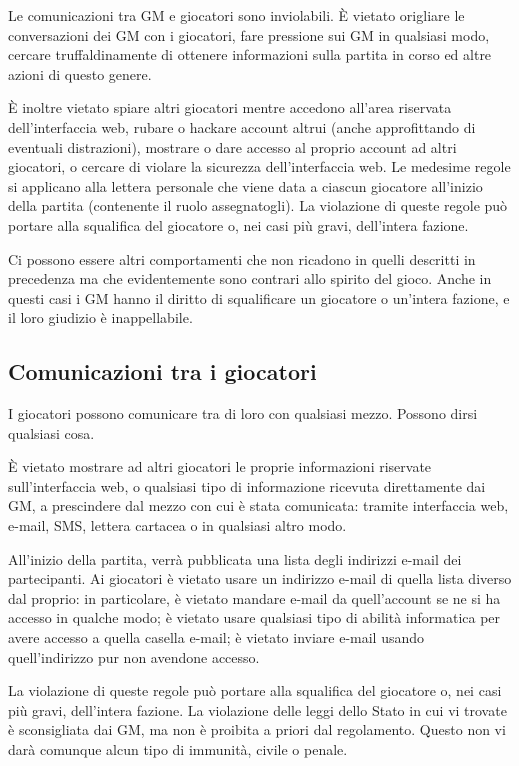 \documentclass[a4paper,10pt]{article}
\begin{document}
Le comunicazioni tra GM e giocatori sono inviolabili. È vietato origliare le conversazioni dei GM con i giocatori, fare pressione sui GM in qualsiasi modo, cercare truffaldinamente di ottenere informazioni sulla partita in corso ed altre azioni di questo genere.

È inoltre vietato spiare altri giocatori mentre accedono all'area riservata dell'interfaccia web, rubare o hackare account altrui (anche approfittando di eventuali distrazioni), mostrare o dare accesso al proprio account ad altri giocatori, o cercare di violare la sicurezza dell'interfaccia web. Le medesime regole si applicano alla lettera personale che viene data a ciascun giocatore all'inizio della partita (contenente il ruolo assegnatogli). La violazione di queste regole può portare alla squalifica del giocatore o, nei casi più gravi, dell'intera fazione.

Ci possono essere altri comportamenti che non ricadono in quelli descritti in precedenza ma che evidentemente sono contrari allo spirito del gioco. Anche in questi casi i GM hanno il diritto di squalificare un giocatore o un'intera fazione, e il loro giudizio è inappellabile.


\subsection{Comunicazioni tra i giocatori}

I giocatori possono comunicare tra di loro con qualsiasi mezzo. Possono dirsi qualsiasi cosa.

È vietato mostrare ad altri giocatori le proprie informazioni riservate sull'interfaccia web, o qualsiasi tipo di informazione ricevuta direttamente dai GM, a prescindere dal mezzo con cui è stata comunicata: tramite interfaccia web, e-mail, SMS, lettera cartacea o in qualsiasi altro modo.

All'inizio della partita, verrà pubblicata una lista degli indirizzi e-mail dei partecipanti. Ai giocatori è vietato usare un indirizzo e-mail di quella lista diverso dal proprio: in particolare, è vietato mandare e-mail da quell'account se ne si ha accesso in qualche modo; è vietato usare qualsiasi tipo di abilità informatica per avere accesso a quella casella e-mail; è vietato inviare e-mail usando quell'indirizzo pur non avendone accesso.

La violazione di queste regole può portare alla squalifica del giocatore o, nei casi più gravi, dell'intera fazione. La violazione delle leggi dello Stato in cui vi trovate è sconsigliata dai GM, ma non è proibita a priori dal regolamento. Questo non vi darà comunque alcun tipo di immunità, civile o penale.
\end{document}
